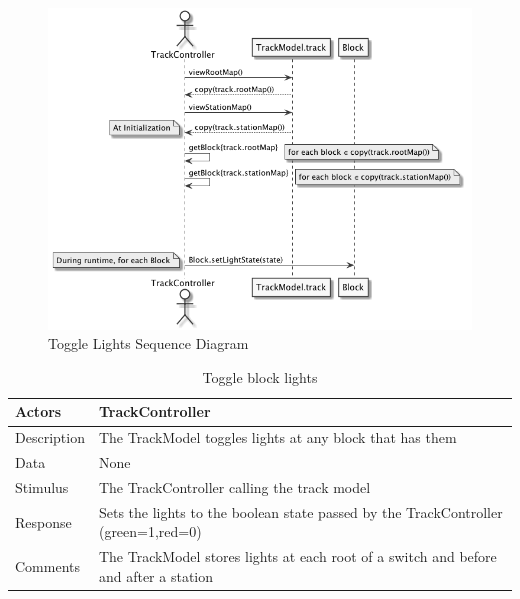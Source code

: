\documentclass[]{article}
\begin{document}
\begin{figure}[H]
	\centering
	\includegraphics[width=\textwidth]{lights.png}
	\caption{Toggle Lights Sequence Diagram}
\end{figure}
\begin{table}[H]
	\centering
	\caption{Toggle block lights}
	\begin{tabular}{|l|l|}
		\hline
		Actors & \parbox[t]{10cm}{TrackController} \\ \hline
		Description & \parbox[t]{10cm}{The TrackModel toggles lights at any block that has them} \\ \hline
		Data &  \parbox[t]{10cm}{None} \\ \hline
		Stimulus &  \parbox[t]{10cm}{The TrackController calling the track model} \\ \hline
		Response & \parbox[t]{10cm}{Sets the lights to the boolean state passed by the TrackController (green=1,red=0)}\\ \hline
		Comments & \parbox[t]{10cm}{The TrackModel stores lights at each root of a switch and before and after a station}  \\ \hline
	\end{tabular}
\end{table}
\end{document}
